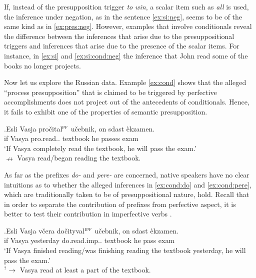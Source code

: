 If, instead of the presupposition trigger \textit{to win}, a scalar item such as \textit{all} is used, the inference under negation, as in the sentence \ref{ex:si:neg}, seems to be of the same kind as in \ref{ex:pres:neg}. However, examples that involve conditionals reveal the difference between the inferences that arise due to the presuppositional triggers and inferences that arise due to the presence of the scalar items. For instance, in \ref{ex:si} and \ref{ex:si:cond:neg} the inference that John read some of the books no longer projects.

Now let us explore the Russian data. Example \ref{ex:cond} shows that the alleged ``process presupposition'' that is claimed to be triggered by perfective accomplishments does not project out of the antecedents of conditionals. Hence, it fails to exhibit one of the properties of semantic presupposition.

\exg.\label{ex:cond}Esli Vasja pro\v{c}ital$^{\textsc{pf}}$ u\v{c}ebnik, on sdast \`{e}kzamen.\\
if Vasya pro.read.. textbook he passes exam\\
\trans `If Vasya completely read the textbook, he will pass the exam.'\\
$\nrightarrow$ Vasya read/began reading the textbook.

As far as the prefixes \textit{do-}   and \textit{pere-}   are concerned, native speakers have no clear intuitions as to whether the alleged inferences in \ref{ex:cond:do} and \ref{ex:cond:pere}, which are traditionally taken to be of presuppositional nature, hold. Recall that in order to separate the contribution of prefixes from perfective aspect, it is better to test their contribution in imperfective verbs .

\exg.\label{ex:cond:do}Esli Vasja v\v{c}era do\v{c}ityval$^{\textsc{ipf}}$ u\v{c}ebnik, on sdast \`{e}kzamen.\\
if Vasya yesterday do.read.imp.. textbook he pass exam\\
\trans `If Vasya finished reading/was finishing reading the textbook yesterday, he will pass the exam.'\\
$^?\rightarrow$ Vasya read at least a part of the textbook.

